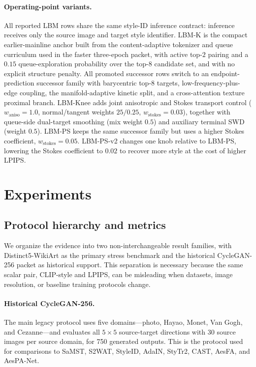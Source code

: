 \documentclass[letterpaper]{article}
\begin{document}
\paragraph{Operating-point variants.}
All reported LBM rows share the same style-ID inference contract: inference receives only the source image and target style identifier. LBM-K is the compact earlier-mainline anchor built from the content-adaptive tokenizer and queue curriculum used in the faster three-epoch packet, with active top-$2$ pairing and a $0.15$ queue-exploration probability over the top-$8$ candidate set, and with no explicit structure penalty. All promoted successor rows switch to an endpoint-prediction successor family with barycentric top-$8$ targets, low-frequency-plus-edge coupling, the manifold-adaptive kinetic split, and a cross-attention texture proximal branch. LBM-Knee adds joint anisotropic and Stokes transport control ($w_{\mathrm{aniso}}=1.0$, normal/tangent weights $25/0.25$, $w_{\mathrm{stokes}}=0.03$), together with queue-side dual-target smoothing (mix weight $0.5$) and auxiliary terminal SWD (weight $0.5$). LBM-PS keeps the same successor family but uses a higher Stokes coefficient, $w_{\mathrm{stokes}}=0.05$. LBM-PS-v2 changes one knob relative to LBM-PS, lowering the Stokes coefficient to $0.02$ to recover more style at the cost of higher LPIPS.

\section{Experiments}
\subsection{Protocol hierarchy and metrics}
We organize the evidence into two non-interchangeable result families, with Distinct5-WikiArt as the primary stress benchmark and the historical CycleGAN-256 packet as historical support. This separation is necessary because the same scalar pair, CLIP-style and LPIPS, can be misleading when datasets, image resolution, or baseline training protocols change.

\paragraph{Historical CycleGAN-256.}
The main legacy protocol uses five domains---photo, Hayao, Monet, Van Gogh, and Cezanne---and evaluates all $5\times5$ source-target directions with 30 source images per source domain, for 750 generated outputs. This is the protocol used for comparisons to SaMST, S2WAT, StyleID, AdaIN, StyTr2, CAST, AesFA, and AesPA-Net.
\end{document}
